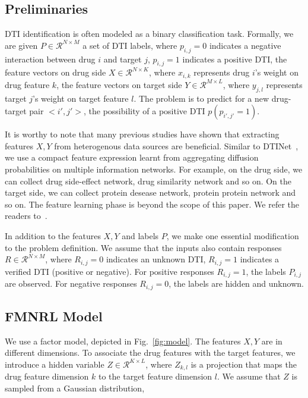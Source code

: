 \documentclass[sigconf,anonymous]{acmart}
\begin{document}
\subsection{Preliminaries}\label{sec:input}
DTI identification is often modeled as a binary classification task. Formally, we are given $P\in \mathcal{R}^{N\times M}$ a set of DTI labels, where $p_{i,j}=0$ indicates a negative interaction between drug $i$ and target $j$, $p_{i,j}=1$ indicates a positive DTI, the feature vectors on drug side $X\in \mathcal{R}^{N \times K}$, where $x_{i,k}$ represents drug $i$'s weight on drug feature $k$, the feature vectors on target side $Y\in \mathcal{R}^{M \times L}$, where $y_{j,l}$ represents target $j$'s weight on target feature $l$. The problem is to predict for a new drug-target pair $<i',j'>$, the possibility of a positive DTI $p(p_{i',j'}=1)$.

It is worthy to note that many previous studies have shown that extracting features $X,Y$ from heterogenous data sources are beneficial. Similar to DTINet~\cite{Luo2017Network}, we use a compact feature expression learnt from aggregating diffusion probabilities on multiple information networks. For example, on the drug side, we can collect drug side-effect network, drug similarity network and so on. On the target side, we can collect protein desease network, protein protein network and so on. The feature learning phase is beyond the scope of this paper. We refer the readers to~\cite{Luo2017Network}.

In addition to the features $X,Y$ and labels $P$, we make one essential modification to the problem definition. We assume that the inputs also contain responses $R\in \mathcal{R}^{N\times M}$, where $R_{i,j}=0$ indicates an unknown DTI, $R_{i,j}=1$ indicates a verified DTI (positive or negative). For positive responses $R_{i,j}=1$, the labels $P_{i,j}$ are observed. For negative responses $R_{i,j}=0$, the labels are hidden and unknown.

\subsection{FMNRL Model}\label{sec:model}

We use a factor model, depicted in Fig.~\ref{fig:model}. The features $X,Y$ are in different dimensions. To associate the drug features with the target features, we introduce a hidden variable $Z\in\mathcal{R}^{K\times L}$, where $Z_{k,l}$ is a projection that maps the drug feature dimension $k$ to the target feature dimension $l$. We assume that $Z$ is sampled from a Gaussian distribution,
\end{document}
